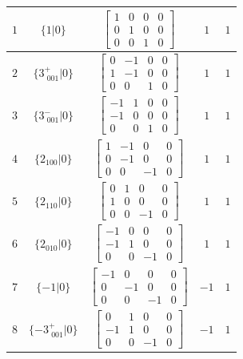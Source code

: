 \documentclass[fleqn,8pt]{jsarticle}
\begin{document}
\begin{longtable}{ccccc}
$ 1 $ & $ \{1|0\} $ & $ \begin{bmatrix} 1 & 0 & 0 & 0 \\ 0 & 1 & 0 & 0 \\ 0 & 0 & 1 & 0 \end{bmatrix} $ & $ 1 $ & $ 1 $ \\ \hline
$ 2 $ & $ \{3^{+}_{\,\,001}|0\} $ & $ \begin{bmatrix} 0 & -1 & 0 & 0 \\ 1 & -1 & 0 & 0 \\ 0 & 0 & 1 & 0 \end{bmatrix} $ & $ 1 $ & $ 1 $ \\ \hline
$ 3 $ & $ \{3^{-}_{\,\,001}|0\} $ & $ \begin{bmatrix} -1 & 1 & 0 & 0 \\ -1 & 0 & 0 & 0 \\ 0 & 0 & 1 & 0 \end{bmatrix} $ & $ 1 $ & $ 1 $ \\ \hline
$ 4 $ & $ \{2{}_{100}|0\} $ & $ \begin{bmatrix} 1 & -1 & 0 & 0 \\ 0 & -1 & 0 & 0 \\ 0 & 0 & -1 & 0 \end{bmatrix} $ & $ 1 $ & $ 1 $ \\ \hline
$ 5 $ & $ \{2{}_{110}|0\} $ & $ \begin{bmatrix} 0 & 1 & 0 & 0 \\ 1 & 0 & 0 & 0 \\ 0 & 0 & -1 & 0 \end{bmatrix} $ & $ 1 $ & $ 1 $ \\ \hline
$ 6 $ & $ \{2{}_{010}|0\} $ & $ \begin{bmatrix} -1 & 0 & 0 & 0 \\ -1 & 1 & 0 & 0 \\ 0 & 0 & -1 & 0 \end{bmatrix} $ & $ 1 $ & $ 1 $ \\ \hline
$ 7 $ & $ \{-1|0\} $ & $ \begin{bmatrix} -1 & 0 & 0 & 0 \\ 0 & -1 & 0 & 0 \\ 0 & 0 & -1 & 0 \end{bmatrix} $ & $ -1 $ & $ 1 $ \\ \hline
$ 8 $ & $ \{-3^{+}_{\,\,001}|0\} $ & $ \begin{bmatrix} 0 & 1 & 0 & 0 \\ -1 & 1 & 0 & 0 \\ 0 & 0 & -1 & 0 \end{bmatrix} $ & $ -1 $ & $ 1 $ \\ \hline

\end{longtable}
\end{document}
